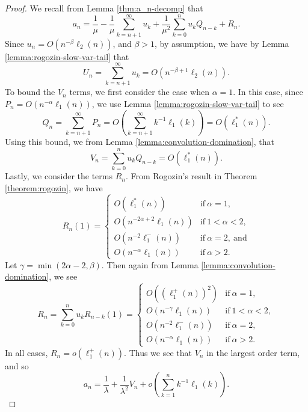 \begin{proof}
    We recall from Lemma \ref{thm:a_n-decomp} that
    \[
       a_n = \frac{1}{\mu}
           - \frac{1}{\mu}\sum_{k=n+1}^\infty u_k
           + \frac{1}{\mu^2} \sum_{k=0}^n u_k Q_{n-k}
           + R_n.
    \]
    Since $u_n =  O(n^{-\beta}\ell_2(n))$, and $\beta > 1$, by assumption, we have by Lemma \ref{lemma:rogozin-slow-var-tail} that
    \[
        U_n = \sum_{k=n+1}^\infty u_k = O(n^{-\beta+1}\ell_2(n)).
    \]
    To bound the $V_n$ terms, we first consider the case when $\alpha = 1$.
    In this case,
    since $P_n = O(n^{-\alpha}\ell_1(n))$,
    we use Lemma \ref{lemma:rogozin-slow-var-tail} to see
    \[
        Q_n = \sum_{k=n+1}^\infty P_n = O\left(\sum_{k=n+1}^\infty k^{-1}\ell_1(k)\right) = O(\ell_1^*(n)).
    \]
    Using this bound, we from Lemma \ref{lemma:convolution-domination},
    that
    \[
        V_n = \sum_{k=0}^n u_k Q_{n-k} = O(\ell_1^*(n)).
    \]
    Lastly, we consider the terms $R_n$.
    From Rogozin's result in Theorem \ref{theorem:rogozin},
    we have
    \[
        R_n(1) = \begin{cases}
            O(\ell_1^*(n)) & \text{if}\ \alpha = 1,\\
            O(n^{-2\alpha+2}\ell_1(n)) & \text{if}\ 1 < \alpha < 2,\\
            O(n^{-2}\ell_1^-(n)) & \text{if}\ \alpha = 2,\ \text{and}\\
            O(n^{-\alpha}\ell_1(n)) & \text{if}\ \alpha > 2.
        \end{cases}
    \]
    Let $\gamma = \min(2\alpha-2, \beta)$.
    Then again from Lemma \ref{lemma:convolution-domination},
    we see
    \[
        R_n = \sum_{k=0}^n u_k R_{n-k}(1) = \begin{cases}
            O((\ell_1^+(n))^2) & \text{if}\ \alpha = 1,\\
            O(n^{-\gamma}\ell_1(n)) & \text{if}\ 1 < \alpha < 2,\\
            O(n^{-2}\ell_1^-(n)) & \text{if}\ \alpha = 2,\\
            O(n^{-\alpha}\ell_1(n)) & \text{if}\ \alpha > 2.
        \end{cases}
    \]
    In all cases, $R_n = o(\ell_1^+(n))$.
    Thus we see that $V_n$ in the largest order term,
    and so
    \[
        a_n =  \frac{1}{\lambda} + \frac{1}{\lambda^2}V_n + o\left(\sum_{k=1}^n k^{-1}\ell_1(k)\right).
    \]
\end{proof}

